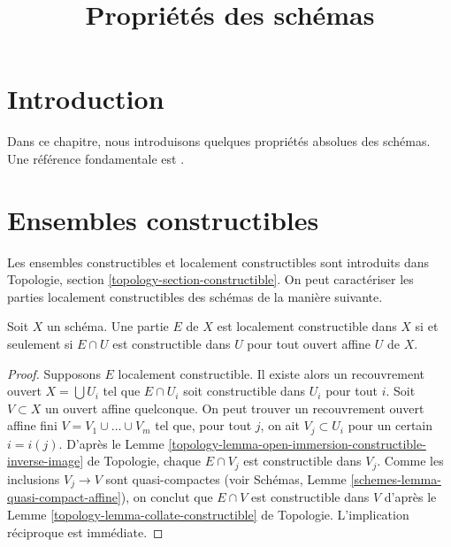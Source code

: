 

%


\title{Propriétés des schémas}


\maketitle

\label{section-phantom}

\tableofcontents

\section{Introduction}
\label{section-introduction}

\noindent
Dans ce chapitre, nous introduisons quelques propriétés absolues des schémas.
Une référence fondamentale est \cite{EGA}.




\section{Ensembles constructibles}
\label{section-constructible}

\noindent
Les ensembles constructibles et localement constructibles sont introduits dans
Topologie, section \ref{topology-section-constructible}.
On peut caractériser les parties localement constructibles des schémas de la
manière suivante.

\begin{lemma}
\label{lemma-locally-constructible}
Soit $X$ un schéma.
Une partie $E$ de $X$ est localement constructible dans $X$ si et seulement si
$E \cap U$ est constructible dans $U$ pour tout ouvert affine $U$ de $X$.
\end{lemma}

\begin{proof}
Supposons $E$ localement constructible. Il existe alors un recouvrement ouvert
$X = \bigcup U_i$ tel que $E \cap U_i$ soit constructible dans $U_i$
pour tout $i$. Soit $V \subset X$ un ouvert affine quelconque. On peut trouver un
recouvrement ouvert affine fini $V = V_1 \cup \ldots \cup V_m$ tel que, pour tout $j$,
on ait $V_j \subset U_i$ pour un certain $i = i(j)$. D'après le
Lemme \ref{topology-lemma-open-immersion-constructible-inverse-image} de Topologie,
chaque $E \cap V_j$ est constructible dans $V_j$. Comme les inclusions
$V_j \to V$ sont quasi-compactes (voir
Schémas, Lemme \ref{schemes-lemma-quasi-compact-affine}),
on conclut que $E \cap V$ est constructible dans $V$ d'après le
Lemme \ref{topology-lemma-collate-constructible} de Topologie.
L'implication réciproque est immédiate.
\end{proof}

